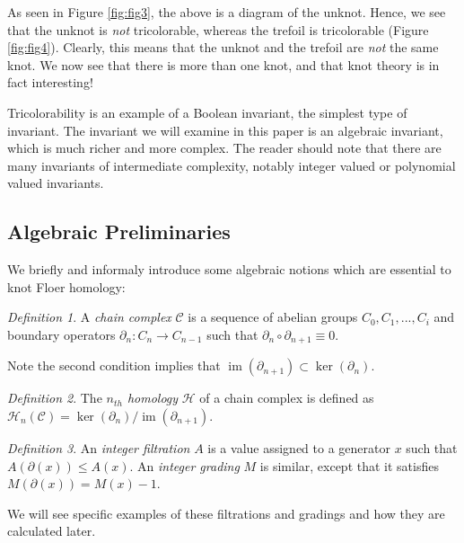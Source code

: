 \documentclass[reqno, 12pt]{amsart}
\theoremstyle{remark}
\newtheorem{definition}{Definition}
\begin{document}
As seen in Figure \ref{fig:fig3}, the above is a diagram of the unknot. Hence, we see that the unknot is \textit{not} tricolorable, whereas the trefoil is tricolorable (Figure \ref{fig:fig4}). Clearly, this means that the unknot and the trefoil are \textit{not} the same knot.  We now see that there is more than one knot, and that knot theory is in fact interesting!

Tricolorability is an example of a Boolean invariant, the simplest type of invariant. The invariant we will examine in this paper is an algebraic invariant, which is much richer and more complex. The reader should note that there are many invariants of intermediate complexity, notably integer valued or polynomial valued invariants.

\subsection{Algebraic Preliminaries}
We briefly and informaly introduce some algebraic notions which are essential to knot Floer homology:
	\begin {definition}
	A \textit{chain complex}  $\mathcal{C}$ is a sequence of abelian groups $C_0, C_1, ... ,C_i$ and boundary operators $\partial_n \colon C_n \to C_{n-1}$ such that  $\partial_n \circ \partial_{n+1} \equiv 0$.
	\end{definition}
	Note the second condition implies that $\operatorname{im}(\partial_{n+1}) \subset \ker(\partial_{n})$.
	\begin {definition}
	The \textit{$n_{th}$ homology}  $\mathcal{H}$ of a chain complex is defined as $\mathcal{H}_n(\mathcal{C}) = \ker(\partial_{n}) / \operatorname{im}(\partial_{n+1})$.
	\end{definition}
	\begin {definition}
		An \textit{integer filtration} $A$ is a value assigned to a generator $x$ such that $A(\partial(x)) \le A(x)$. An \textit{integer grading} $M$ is similar, except that it satisfies $M(\partial(x)) = M(x)-1.$
	\end{definition}
	We will see specific examples of these filtrations and gradings and how they are calculated later.
\end{document}
